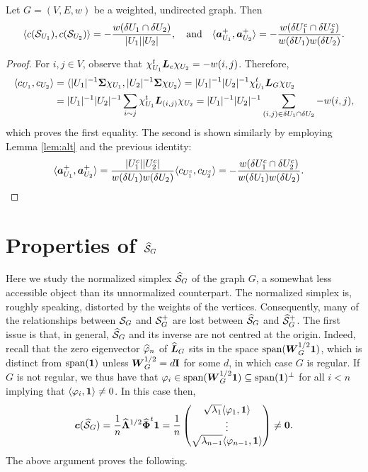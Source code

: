 \begin{lemma}
Let $G=(V,E,w)$ be a weighted, undirected graph. Then 
\begin{equation*}
    \langle c(\mathcal{S}_{U_1}),c(\mathcal{S}_{U_2})\rangle = - \frac{w(\delta U_1\cap \delta U_2)}{|U_1||U_2|},\quad\text{and}\quad \langle \vb*{a}^+_{U_1},\vb*{a}^+_{U_2}\rangle = -\frac{w(\delta U_1^c\cap \delta U_2^c)}{w(\delta U_1)w(\delta U_2)}.
\end{equation*}
\end{lemma}
\begin{proof}
For $i,j\in V$, observe that $\chi_{U_1}^t \vb*{L}_e\chi_{U_2}=-w(i,j)$. Therefore, 
\begin{align*}
    \langle c_{U_1},c_{U_2}\rangle &= \langle |U_1|^{-1}\boldsymbol{\Sigma}\chi_{U_1},|U_2|^{-1}\boldsymbol{\Sigma}\chi_{U_2}\rangle = |U_1|^{-1}|U_2|^{-1} \chi_{U_1}^t \vb*{L}_G\chi_{U_2} \\
    &= |U_1|^{-1}|U_2|^{-1}\sum_{i\sim j} \chi_{U_1}^t \vb*{L}_{(i,j)}\chi_{U_2} = |U_1|^{-1}|U_2|^{-1}\sum_{(i,j)\in \delta U_1\cap \delta U_2} -w(i,j),
\end{align*}
which proves the first equality. The second is shown similarly by employing Lemma \ref{lem:alt} and the previous identity:
\begin{align*}
    \langle \vb*{a}^+_{U_1},\vb*{a}^+_{U_2}\rangle &= \frac{|U_1^c||U_2^c|}{w(\delta U_1) w(\delta U_2)}\langle c_{U_1^c},c_{U_2^c}\rangle
    =-\frac{w(\delta U_1^c\cap \delta U_2^c)}{w(\delta U_1)w(\delta U_2)}.\qedhere
\end{align*}

\end{proof}

\section{Properties of \texorpdfstring{$\widehat{\mathcal{S}}_G$}{the normalized Simplex}}

Here we study the normalized simplex $\widehat{\mathcal{S}}_G$ of the graph $G$, a somewhat less accessible object than its unnormalized counterpart.  The normalized simplex is, roughly speaking, distorted by the weights of the vertices. Consequently, many of the relationships between $\mathcal{S}_G$ and $\mathcal{S}_G^+$ are lost between $\widehat{\mathcal{S}}_G$ and $\widehat{\mathcal{S}}_G^+$. The first issue is that, in general, $\widehat{\mathcal{S}}_G$ and its inverse are not centred at the origin. Indeed, recall that the zero eigenvector $\widehat{\varphi}_n$ of $\widehat{\vb*{L}}_G$ sits in the space $\textnormal{span}(\vb*{W}^{1/2}_G\vb{1})$, which is distinct from $\textnormal{span}(\vb{1})$ unless $\vb*{W}^{1/2}_G=d\vb{I}$ for some $d$, in which case $G$ is regular.
If $G$ is not regular, we thus have that $\varphi_i \in \textnormal{span}(\vb*{W}^{1/2}_G\vb{1})\subseteq \textnormal{span}(\vb{1})^\perp$ for all $i<n$ implying that $\langle \varphi_i,\vb{1}\rangle \neq 0$. In this case then,  
 \[\vb*{c}(\widehat{\mathcal{S}}_G) = \frac{1}{n} \widehat{\vb{\Lambda}}^{1/2}\widehat{\boldsymbol{\Phi}}^t \vb{1} = \frac{1}{n} \begin{pmatrix}
 \sqrt{\lambda_1}\langle \varphi_1,\vb{1}\rangle \\
 \vdots \\
\sqrt{ \lambda_{n-1}}\langle \varphi_{n-1},\vb{1} \rangle
 \end{pmatrix}\neq \vb{0}.\]
The above argument proves the following.

